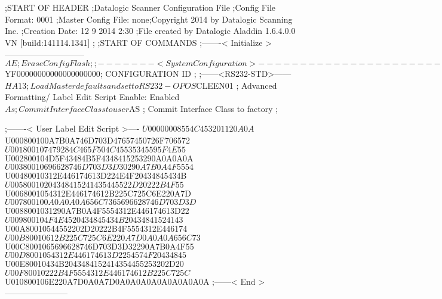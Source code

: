 ;START OF HEADER
;Datalogic Scanner Configuration File
;Config File Format: 0001
;Master Config File: none;Copyright 2014 by Datalogic Scanning Inc.
;Creation Date: 12 9 2014 2:30
;File created by Datalogic Aladdin 1.6.4.0.0 VN [build:141114.1341]
;
;START OF COMMANDS
;-------< Initialize >-----------------------------
$AE                 ; Erase Config Flash
;
;-------< System Configuration >-------------------------------
$YF00000000000000000000; CONFIGURATION ID
;
;------<RS232-STD>------
$HA13               ; Load Master defaults and set to RS232-OPOS
$CLEEN01            ; Advanced Formatting/ Label Edit Script Enable: Enabled
$As                 ; Commit Interface Class to user
$AS                 ; Commit Interface Class to factory
;

;-------< User Label Edit Script >----
$U00000008554C453201120A0A
$U000800100A7B0A746D703D47657450726F706572
$U001800107479284C465F504C45535345595F4E55
$U002800104D5F43484B5F4348415253290A0A0A0A
$U00380010696628746D703D3D30290A7B0A4F5554
$U00480010312E446174613D224E4F20434845434B
$U00580010204348415241435445522D20222B4F55
$U0068001054312E446174612B225C725C6E220A7D
$U007800100A0A0A0A656C7365696628746D703D3D
$U0088001031290A7B0A4F5554312E446174613D22
$U009800104F4E4520434845434B20434841524143
$U00A80010544552202D20222B4F5554312E446174
$U00B80010612B225C725C6E220A7D0A0A0A656C73
$U00C8001065696628746D703D3D32290A7B0A4F55
$U00D8001054312E446174613D2254574F20434845
$U00E80010434B2043484152414354455253202D20
$U00F80010222B4F5554312E446174612B225C725C
$U010800106E220A7D0A0A7D0A0A0A0A0A0A0A0A0A
;------< End >-----------------------
